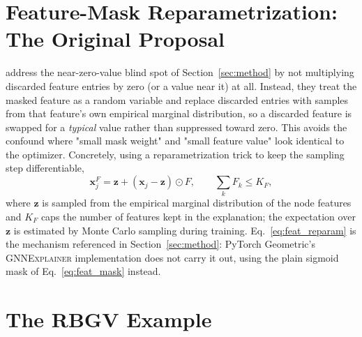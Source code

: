 \documentclass{article}
\newcommand{\GNNEx}{\textsc{GNNExplainer}\xspace}
\newcommand{\bfx}{\mathbf{x}}
\newcommand{\bfz}{\mathbf{z}}
\theoremstyle{definition}
\begin{document}
\section{Feature-Mask Reparametrization: The Original Proposal}
\label{app:featmask}

\citet{ying2019gnnexplainer} address the near-zero-value blind spot of
Section~\ref{sec:method} by not multiplying discarded feature entries by zero
(or a value near it) at all. Instead, they treat the masked feature as a random
variable and replace discarded entries with samples from that feature's own
empirical marginal distribution, so a discarded feature is swapped for a
\emph{typical} value rather than suppressed toward zero. This avoids the
confound where "small mask weight" and "small feature value" look identical to
the optimizer. Concretely, using a reparametrization trick to keep the sampling
step differentiable,
\begin{equation}
  \bfx_j^F = \bfz + (\bfx_j - \bfz) \odot F,
  \qquad \textstyle\sum_k F_k \leq K_F,
  \label{eq:feat_reparam}
\end{equation}
where $\bfz$ is sampled from the empirical marginal distribution of the node
features and $K_F$ caps the number of features kept in the explanation; the
expectation over $\bfz$ is estimated by Monte Carlo sampling during training.
Eq.~\eqref{eq:feat_reparam} is the mechanism referenced in
Section~\ref{sec:method}: PyTorch Geometric's \GNNEx implementation does not
carry it out, using the plain sigmoid mask of Eq.~\eqref{eq:feat_mask} instead.

\section{The RBGV Example}
\label{app:rbgv}
\end{document}
